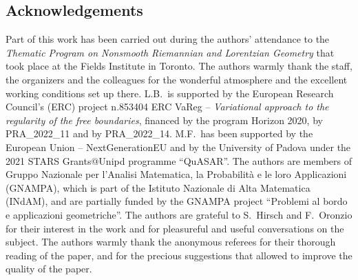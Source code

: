 \documentclass[10pt,a4paper]{amsart}
\numberwithin{equation}{section}
\begin{document}
\subsection*{Acknowledgements}
Part of this work has been carried out during the authors' attendance to the \emph{Thematic Program on Nonsmooth Riemannian and Lorentzian Geometry} that took place at the Fields Institute in Toronto. The authors warmly thank the staff, the organizers and the colleagues for the wonderful atmosphere and the excellent working conditions set up there.
L.B.~is supported by the European Research Council's (ERC) project n.853404 ERC VaReg -- \textit{Variational approach to the regularity of the free boundaries}, financed by the program Horizon 2020, by PRA\_2022\_11 and by PRA\_2022\_14.
M.F.~has been supported by the European Union -- NextGenerationEU and by the University of Padova under the 2021 STARS Grants@Unipd programme ``QuASAR''.
The authors are members of Gruppo Nazionale per l'Analisi Matematica, la Probabilit\`a e le loro Applicazioni (GNAMPA), which is part of the Istituto
Nazionale di Alta Matematica (INdAM), and are partially funded by the GNAMPA project ``Problemi al bordo e applicazioni geometriche''.
The authors are grateful to S.~Hirsch and F.~Oronzio for their interest in the work and for pleasureful and useful conversations on the subject. The authors warmly thank the anonymous referees for their thorough reading of the paper, and for the precious suggestions that allowed to improve the quality of the paper.

\end{document}
